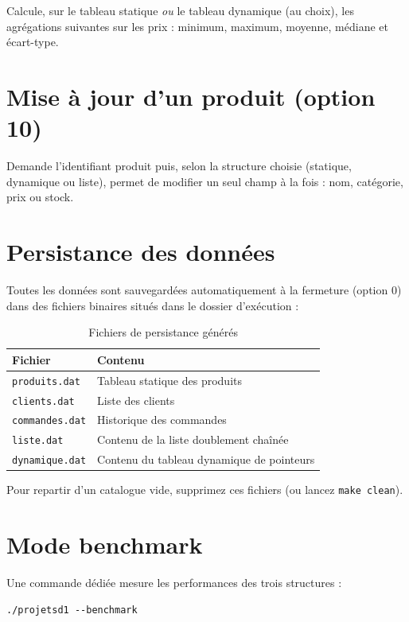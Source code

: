 \documentclass[11pt,a4paper]{article}
\begin{document}
Calcule, sur le tableau statique \emph{ou} le tableau dynamique (au choix),
les agrégations suivantes sur les prix : minimum, maximum, moyenne,
médiane et écart-type.

\section{Mise à jour d'un produit (option 10)}

Demande l'identifiant produit puis, selon la structure choisie (statique,
dynamique ou liste), permet de modifier un seul champ à la fois : nom,
catégorie, prix ou stock.

\section{Persistance des données}

Toutes les données sont sauvegardées automatiquement à la fermeture
(option 0) dans des fichiers binaires situés dans le dossier d'exécution :

\begin{table}[h]
\centering
\begin{tabular}{ll}
\toprule
Fichier & Contenu \\
\midrule
\texttt{produits.dat}   & Tableau statique des produits \\
\texttt{clients.dat}    & Liste des clients \\
\texttt{commandes.dat}  & Historique des commandes \\
\texttt{liste.dat}      & Contenu de la liste doublement chaînée \\
\texttt{dynamique.dat}  & Contenu du tableau dynamique de pointeurs \\
\bottomrule
\end{tabular}
\caption{Fichiers de persistance générés}
\end{table}

Pour repartir d'un catalogue vide, supprimez ces fichiers (ou lancez
\texttt{make clean}).

\section{Mode benchmark}

Une commande dédiée mesure les performances des trois structures :

\begin{lstlisting}
./projetsd1 --benchmark
\end{lstlisting}
\end{document}
